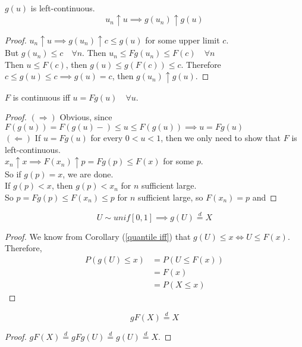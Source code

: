 \documentclass[11pt]{article}
\numberwithin{equation}{section}
\begin{document}
\corollary $g(u)$ is left-continuous.
\begin{equation}
	u_n \uparrow u \implies g(u_n) \uparrow g(u)
\end{equation}
\begin{proof}
	$u_n \uparrow u \implies g(u_n) \uparrow c \leq g(u)$ for some upper limit $c$. \\
	But $g(u_n) \leq c \quad \forall n$. Then $u_n \leq Fg(u_n) \leq F(c) \quad \forall n$ \\
	Then $u \leq F(c)$, then $g(u) \leq g(F(c)) \leq c$.
	Therefore $c \leq g(u) \leq c \implies g(u) = c$, then $g(u_n) \uparrow g(u)$.
\end{proof}

\corollary \label{u=Fg(u)}$F$ is continuous iff $u = Fg(u) \quad \forall u$.
\begin{proof}
	$(\Rightarrow)$ Obvious, since $F(g(u)) = F(g(u)-) \leq u \leq F(g(u)) \implies u = Fg(u)$ \\
	$(\Leftarrow)$  If $u = Fg(u)$ for every $0 < u < 1$, then we only need to show that $F$ is left-continuous.\\
	$x_n \uparrow x \implies F(x_n) \uparrow p = Fg(p) \leq F(x)$ for some $p$.\\
	So if $g(p) = x$, we are done. \\
	If $g(p) < x$, then $g(p) < x_n$ for $n$ sufficient large.\\
	So $p = Fg(p) \leq F(x_n) \leq p$ for $n$ sufficient large, so $F(x_n) = p$ and 
\end{proof}

 \label{the quantile transform}
\begin{equation}
	U \sim unif[0, 1] \implies g(U) \overset{d}{=} X
\end{equation}
\begin{proof}
	We know from Corollary (\ref{quantile iff}) that $g(U) \leq x \iff U \leq F(x)$.\\
	Therefore,
	\begin{align*}
		P(g(U) \leq x) &= P(U \leq F(x)) \\
		&= F(x) \tag{by the property of uniform distribution}\\
		&= P(X\leq x)
	\end{align*}
\end{proof}

\corollary 
\begin{equation}
	gF(X) \overset{d}{=} X
\end{equation}
\begin{proof}
	$gF(X) \overset{d}{=} gFg(U) \overset{d}{=} g(U) \overset{d}{=} X$.
\end{proof}
\end{document}
